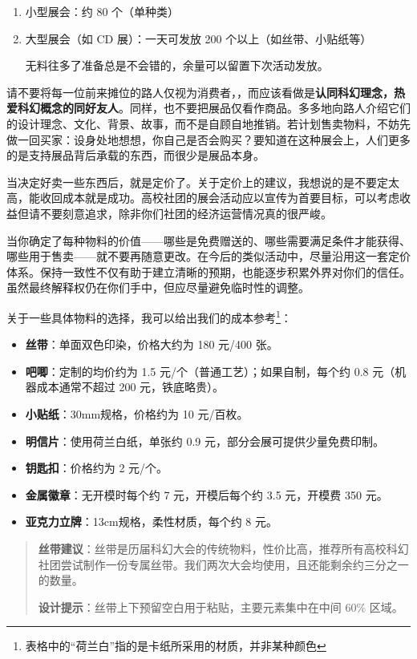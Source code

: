 \begin{enumerate}
\def\labelenumi{\arabic{enumi}.}
\item
  小型展会：约 80 个（单种类）
\item
  大型展会（如 CD 展）：一天可发放 200 个以上（如丝带、小贴纸等）

  无料往多了准备总是不会错的，余量可以留置下次活动发放。
\end{enumerate}

请不要将每一位前来摊位的路人仅视为消费者，，而应该看做是\textbf{认同科幻理念，热爱科幻概念的同好友人}。同样，也不要把展品仅看作商品。多多地向路人介绍它们的设计理念、文化、背景、故事，而不是自顾自地推销。若计划售卖物料，不妨先做一回买家：设身处地想想，你自己是否会购买？要知道在这种展会上，人们更多的是支持展品背后承载的东西，而很少是展品本身。

当决定好卖一些东西后，就是定价了。关于定价上的建议，我想说的是不要定太高，能收回成本就是成功。高校社团的展会活动应以宣传为首要目标，可以考虑收益但请不要刻意追求，除非你们社团的经济运营情况真的很严峻。

当你确定了每种物料的价值------哪些是免费赠送的、哪些需要满足条件才能获得、哪些用于售卖------就不要再随意更改。在今后的类似活动中，尽量沿用这一套定价体系。保持一致性不仅有助于建立清晰的预期，也能逐步积累外界对你们的信任。虽然最终解释权仍在你们手中，但应尽量避免临时性的调整。

关于一些具体物料的选择，我可以给出我们的成本参考\footnote{表格中的``荷兰白''指的是卡纸所采用的材质，并非某种颜色}：

\begin{itemize}
\item
  \textbf{丝带}：单面双色印染，价格大约为 180 元/400 张。
\item
  \textbf{吧唧}：定制的均价约为 1.5 元/个（普通工艺）；如果自制，每个约
  0.8 元（机器成本通常不超过 200 元，铁底略贵）。
\item
  \textbf{小贴纸}：30mm规格，价格约为 10 元/百枚。
\item
  \textbf{明信片}：使用荷兰白纸，单张约 0.9
  元，部分会展可提供少量免费印制。
\item
  \textbf{钥匙扣}：价格约为 2 元/个。
\item
  \textbf{金属徽章}：无开模时每个约 7 元，开模后每个约 3.5 元，开模费
  350 元。
\item
  \textbf{亚克力立牌}：13cm规格，柔性材质，每个约 8 元。
\end{itemize}

\begin{quote}
\textbf{丝带建议}：丝带是历届科幻大会的传统物料，性价比高，推荐所有高校科幻社团尝试制作一份专属丝带。我们两次大会均使用，且还能剩余约三分之一的数量。

\textbf{设计提示}：丝带上下预留空白用于粘贴，主要元素集中在中间 60\%
区域。
\end{quote}

